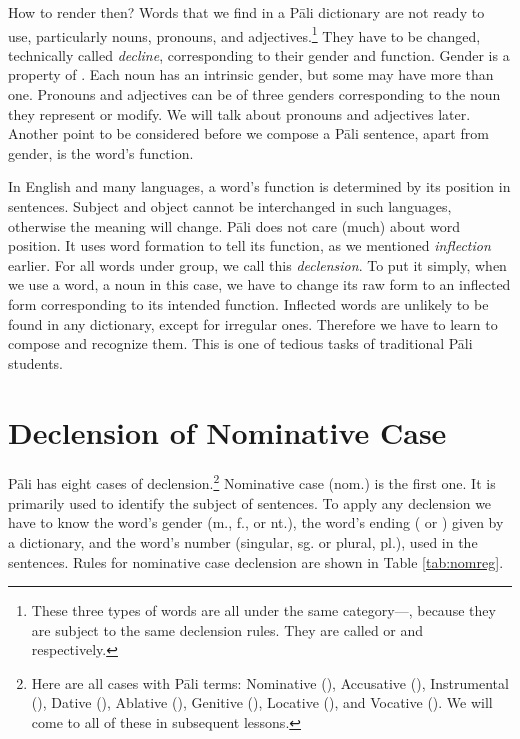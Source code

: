 How to render then? Words that we find in a P\=ali dictionary are not ready to use, particularly nouns, pronouns, and adjectives.\footnote{These three types of words are all under the same category---, because they are subject to the same declension rules. They are called  or  and  respectively.} They have to be changed, technically called \emph{decline}, corresponding to their gender and function. Gender is a property of . Each noun has an intrinsic gender, but some may have more than one. Pronouns and adjectives can be of three genders corresponding to the noun they represent or modify. We will talk about pronouns and adjectives later. Another point to be considered before we compose a P\=ali sentence, apart from gender, is the word's function.

In English and many languages, a word's function is determined by its position in sentences. Subject and object cannot be interchanged in such languages, otherwise the meaning will change. P\=ali does not care (much) about word position. It uses word formation to tell its function, as we mentioned \emph{inflection} earlier. For all words under  group, we call this \emph{declension}. To put it simply, when we use a word, a noun in this case, we have to change its raw form to an inflected form corresponding to its intended function. Inflected words are unlikely to be found in any dictionary, except for irregular ones. Therefore we have to learn to compose and recognize them. This is one of tedious tasks of traditional P\=ali students.

{}
\section*{Declension of Nominative Case}

P\=ali has eight cases of declension.\footnote{Here are all cases with P\=ali terms: Nominative (), Accusative (), Instrumental (), Dative (), Ablative (), Genitive (), Locative (), and Vocative (). We will come to all of these in subsequent lessons.} Nominative case (nom.) is the first one. It is primarily used to identify the subject of sentences. To apply any declension we have to know the word's gender (m., f., or nt.), the word's ending ( or ) given by a dictionary, and the word's number (singular, sg. or plural, pl.), used in the sentences. Rules for nominative case declension are shown in Table \ref{tab:nomreg}.


